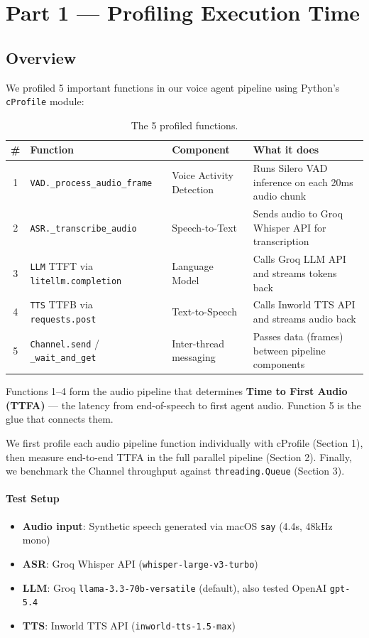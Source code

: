 \section{Part 1 --- Profiling Execution Time}

\subsection{Overview}

We profiled 5 important functions in our voice agent pipeline using Python's \texttt{cProfile} module:

\begin{table}[h]
\centering
\begin{tabular}{|c|l|l|l|}
\hline
\textbf{\#} & \textbf{Function} & \textbf{Component} & \textbf{What it does} \\
\hline
1 & \texttt{VAD.\_process\_audio\_frame} & Voice Activity Detection & Runs Silero VAD inference on each 20ms audio chunk \\
2 & \texttt{ASR.\_transcribe\_audio} & Speech-to-Text & Sends audio to Groq Whisper API for transcription \\
3 & \texttt{LLM} TTFT via \texttt{litellm.completion} & Language Model & Calls Groq LLM API and streams tokens back \\
4 & \texttt{TTS} TTFB via \texttt{requests.post} & Text-to-Speech & Calls Inworld TTS API and streams audio back \\
5 & \texttt{Channel.send} / \texttt{\_wait\_and\_get} & Inter-thread messaging & Passes data (frames) between pipeline components \\
\hline
\end{tabular}
\caption{The 5 profiled functions.}
\end{table}

Functions 1--4 form the audio pipeline that determines \textbf{Time to First Audio (TTFA)} --- the latency from end-of-speech to first agent audio. Function 5 is the glue that connects them.

We first profile each audio pipeline function individually with cProfile (Section 1), then measure end-to-end TTFA in the full parallel pipeline (Section 2). Finally, we benchmark the Channel throughput against \texttt{threading.Queue} (Section 3).

\paragraph{Test Setup}
\begin{itemize}
    \item \textbf{Audio input}: Synthetic speech generated via macOS \texttt{say} (4.4s, 48kHz mono)
    \item \textbf{ASR}: Groq Whisper API (\texttt{whisper-large-v3-turbo})
    \item \textbf{LLM}: Groq \texttt{llama-3.3-70b-versatile} (default), also tested OpenAI \texttt{gpt-5.4}
    \item \textbf{TTS}: Inworld TTS API (\texttt{inworld-tts-1.5-max})
\end{itemize}

